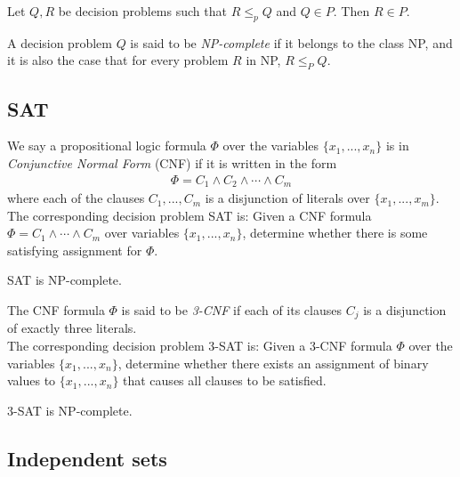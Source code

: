 \documentclass{article}
\begin{document}
\begin{theorem}
	Let $Q,R$ be decision problems such that $R\leq_p Q$ and
	$Q\in P$. Then $R\in P$.
\end{theorem}

\begin{definition}
	A decision problem $Q$ is said to be \emph{NP-complete} if it
	belongs to the class NP, and it is also the case that for every
	problem $R$ in NP, $R\leq_P Q$.
\end{definition}

\subsection{SAT}

\begin{definition}
	We say a propositional logic formula $\Phi$ over the variables
	$\{x_1, ..., x_n\}$ is in \emph{Conjunctive Normal Form} (CNF)
	if it is written in the form
	\begin{align*}
		\Phi = C_1 \wedge C_2 \wedge \cdots \wedge C_m
	\end{align*}
	where each of the clauses $C_1, ..., C_m$ is a disjunction
	of literals over $\{x_1,...,x_m\}$.\\
	The corresponding decision problem SAT is:
	Given a CNF formula $\Phi=C_1\wedge\cdots\wedge C_m$ over
	variables $\{x_1,...,x_n\}$, determine whether there is some
	satisfying assignment for $\Phi$.
\end{definition}

\begin{theorem}
	SAT is NP-complete.
\end{theorem}

\begin{definition}
	The CNF formula $\Phi$ is said to be \emph{3-CNF} if each of its clauses
	$C_j$ is a disjunction of exactly three literals.\\
	The corresponding decision problem 3-SAT is:
	Given a 3-CNF formula $\Phi$ over the variables $\{x_1,...,x_n\}$,
	determine whether there exists an assignment of binary values to
	$\{x_1,...,x_n\}$ that causes all clauses to be satisfied.
\end{definition}

\begin{theorem}
	3-SAT is NP-complete.
\end{theorem}

\subsection{Independent sets}
\end{document}
